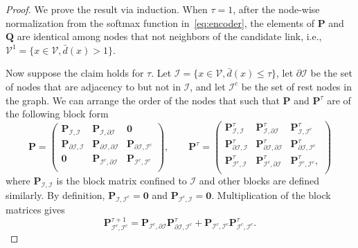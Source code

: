 \documentclass[11pt]{article}
\begin{document}
\begin{proof}
We prove the result via induction. When $\tau = 1$, after the node-wise normalization from the softmax function in~\eqref{eq:encoder}, the elements of $\mathbf{P}$ and $\mathbf{Q}$ are identical among nodes that not neighbors of the candidate link, i.e., $\mathcal{V}^{1}=\{x\in\mathcal{V}, \bar{d}(x)>1\}$.

Now suppose the claim holds for $\tau$. Let $\mathcal{I}=\{x\in\mathcal{V}, \bar{d}(x)\leq \tau\}$, let $\partial \mathcal{I}$ be the set of nodes that are adjacency to but not in $\mathcal{I}$, and let $\mathcal{I}^c$ be the set of rest nodes in the graph.  We can arrange the order of the nodes that such that $\mathbf{P}$  and $\mathbf{P}^{\tau}$ are of the following block form
\begin{equation}
\mathbf{P} = \begin{pmatrix}
\mathbf{P}_{\mathcal{I},\mathcal{I}} & \mathbf{P}_{\mathcal{I},\mathcal{\partial I}} & \mathbf{0}\\
\mathbf{P}_{\partial\mathcal{I},\mathcal{I}} & \mathbf{P}_{\partial\mathcal{I},\mathcal{\partial I}} & \mathbf{P}_{\partial\mathcal{I},\mathcal{I}^c}\\
\mathbf{0} & \mathbf{P}_{\mathcal{I}^c,\mathcal{\partial I}} & \mathbf{P}_{\mathcal{I}^c,\mathcal{I}^c}\\
\end{pmatrix},\qquad
\mathbf{P}^{\tau} = \begin{pmatrix}
\mathbf{P}^{\tau}_{\mathcal{I},\mathcal{I}} & \mathbf{P}^{\tau}_{\mathcal{I},\mathcal{\partial I}} & \mathbf{P}^{\tau}_{\mathcal{I},\mathcal{I}^c}\\
\mathbf{P}^{\tau}_{\partial\mathcal{I},\mathcal{I}} & \mathbf{P}^{\tau}_{\partial\mathcal{I},\mathcal{\partial I}} & \mathbf{P}^{\tau}_{\partial\mathcal{I},\mathcal{I}^c}\\
\mathbf{P}^{\tau}_{\mathcal{I}^c,\mathcal{I}} & \mathbf{P}^{\tau}_{\mathcal{I}^c,\mathcal{\partial I}} & \mathbf{P}^{\tau}_{\mathcal{I}^c,\mathcal{I}^c},\\
\end{pmatrix}
\end{equation}
where $\mathbf{P}_{\mathcal{I},\mathcal{I}}$ is the block matrix confined to $\mathcal{I}$ and other blocks are defined similarly. By definition, $\mathbf{P}_{\mathcal{I},\mathcal{I}^c}=\mathbf{0}$ and $\mathbf{P}_{\mathcal{I}^c,\mathcal{I}}=\mathbf{0}$. Multiplication of the block matrices gives
\begin{equation}
\mathbf{P}^{\tau+1}_{\mathcal{I}^c,\mathcal{I}^c} = \mathbf{P}_{\mathcal{I}^c,\mathcal{\partial I}}\mathbf{P}^{\tau}_{\partial\mathcal{I},\mathcal{I}^c} + \mathbf{P}_{\mathcal{I}^c,\mathcal{I}^c}\mathbf{P}^{\tau}_{\mathcal{I}^c,\mathcal{I}^c}.

\end{equation}
\end{proof}
\end{document}
